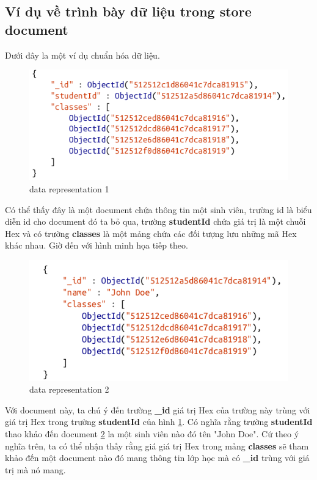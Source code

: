\subsection{Ví dụ về trình bày dữ liệu trong store document}
Dưới đây la một ví dụ chuẩn hóa dữ liệu.
\begin{figure}[h!]
		\centering
		\includegraphics[scale=0.5]{charts/nor1.png}
		\caption{data representation 1}
		\label{fig:datare}
\end{figure}
Có thể thấy đây là một document chứa thông tin một sinh viên, trường id là biểu diễn id cho document đó ta bỏ qua, trường \textbf{studentId} chứa giá trị là một chuỗi Hex và có trường \textbf{classes} là một mảng chứa các đối tượng lưu những mã Hex khác nhau. Giờ đến với hình minh họa tiếp theo.
\begin{figure}[h!]
		\centering
		\includegraphics[scale=0.5]{charts/nor2.png}
		\caption{data representation 2}
		\label{fig:datare2}
\end{figure}
Với document này, ta chú ý đến trường \textbf{\_id} giá trị Hex của trường này trùng với giá trị Hex trong trường \textbf{studentId} của hình \ref{fig:datare}. Có nghĩa rằng trường \textbf{studentId} thao khảo đến document \ref{fig:datare2} la một sinh viên nào đó tên "John Doe". Cứ theo ý nghĩa trên, ta có thể nhận thấy rằng giá giá trị Hex trong mảng \textbf{classes} sẽ tham khảo đến một document nào đó mang thông tin lớp học mà có \textbf{\_id} trùng với giá trị mà nó mang.\\

